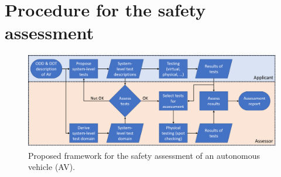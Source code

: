 \documentclass[twoside,twocolumn,9pt]{article}
\theoremstyle{plain}
\theoremstyle{remark}\newtheorem{remarkenv}{Remark}        %
\begin{document}
\section{Procedure for the safety assessment}
\label{sec:procedure}

\begin{figure}
	\centering
	\includegraphics[width=\linewidth]{procedure2}
	\caption{Proposed framework for the safety assessment of an autonomous vehicle (AV).}
	\label{fig:procedure}
\end{figure}
\end{document}
